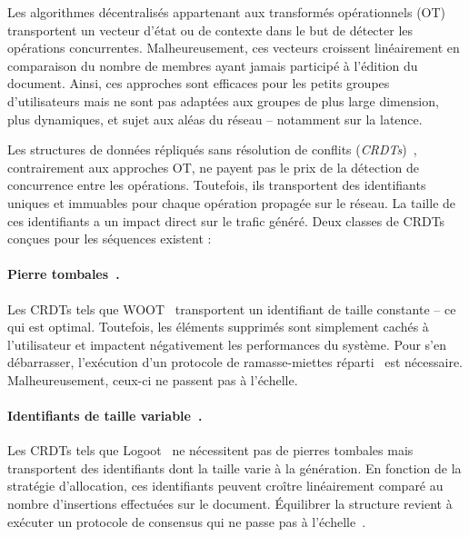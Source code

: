 Les algorithmes décentralisés appartenant aux transformés opérationnels
(OT)~\cite{sun1998operational, sun2009contextbased} transportent un vecteur
d'état ou de contexte dans le but de détecter les opérations
concurrentes. Malheureusement, ces vecteurs croissent linéairement en
comparaison du nombre de membres ayant jamais participé à l'édition du
document. Ainsi, ces approches sont efficaces pour les petits groupes
d'utilisateurs mais ne sont pas adaptées aux groupes de plus large dimension,
plus dynamiques, et sujet aux aléas du réseau -- notamment sur la latence.

Les structures de données répliqués sans résolution de conflits
(\emph{CRDTs})~\cite{shapiro2011comprehensive, shapiro2011conflict,
burckhardt2014replicated}, contrairement aux approches OT, ne payent pas le prix
de la détection de concurrence entre les opérations. Toutefois, ils transportent
des identifiants uniques et immuables pour chaque opération propagée sur le
réseau. La taille de ces identifiants a un impact direct sur le trafic généré.
Deux classes de CRDTs conçues pour les séquences existent :

\paragraph{Pierre tombales~\cite{ahmed2011evaluating, attiya2016specification,
conway2014language, grishchenko2010deep, oster2006data, roh2011replicated,
weiss2007wooki, wu2010partial, yu2012stringwise}.} Les CRDTs tels que
WOOT~\cite{oster2006data} transportent un identifiant de taille constante -- ce
qui est optimal. Toutefois, les éléments supprimés sont simplement cachés à
l'utilisateur et impactent négativement les performances du système. Pour s'en
débarrasser, l'exécution d'un protocole de ramasse-miettes
réparti~\cite{abdullahi1998garbage} est nécessaire. Malheureusement, ceux-ci ne
passent pas à l'échelle.

\paragraph{Identifiants de taille variable~\cite{andre2013supporting,
 preguica2009commutative, weiss2009logoot}.} Les CRDTs tels que
Logoot~\cite{weiss2009logoot} ne nécessitent pas de pierres tombales mais
transportent des identifiants dont la taille varie à la génération. En fonction
de la stratégie d'allocation, ces identifiants peuvent croître linéairement
comparé au nombre d'insertions effectuées sur le document. Équilibrer la
structure revient à exécuter un protocole de consensus qui ne passe pas à
l'échelle~\cite{mostefaoui2015signature}.

